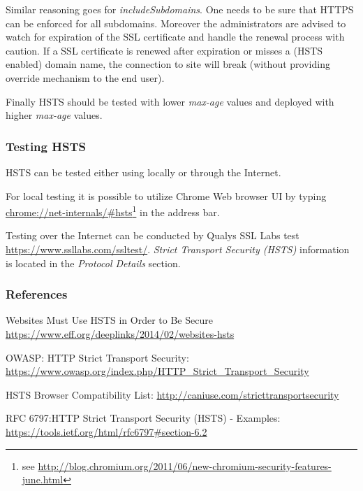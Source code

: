Similar reasoning goes for \emph{includeSubdomains}. One needs to be sure that HTTPS can be enforced for all subdomains. Moreover the administrators are advised to watch for expiration of the SSL certificate and handle the renewal process with caution. If a SSL certificate is renewed after expiration or misses a (HSTS enabled) domain name, the connection to site will break (without providing override mechanism to the end user).  

Finally HSTS should be tested with lower \emph{max-age} values and deployed with higher \emph{max-age} values. 

\subsubsection{Testing HSTS}
\label{subsubsection:Testing HSTS}
HSTS can be tested either using locally or through the Internet. 

For local testing it is possible to utilize Chrome Web browser UI by typing \url{chrome://net-internals/#hsts}\footnote{see \url{http://blog.chromium.org/2011/06/new-chromium-security-features-june.html}} in the address bar.

Testing over the Internet can be conducted by Qualys SSL Labs test \url{https://www.ssllabs.com/ssltest/}. \emph{Strict Transport Security (HSTS)} information is located in the \emph{Protocol Details} section.

\subsubsection{References}
\begin{itemize*}
	\item Websites Must Use HSTS in Order to Be Secure \url{https://www.eff.org/deeplinks/2014/02/websites-hsts}
	\item OWASP: HTTP Strict Transport Security: \url{https://www.owasp.org/index.php/HTTP_Strict_Transport_Security}
	\item HSTS Browser Compatibility List: \url{http://caniuse.com/stricttransportsecurity}
  \item RFC 6797:HTTP Strict Transport Security (HSTS) - Examples: \url{https://tools.ietf.org/html/rfc6797#section-6.2}
\end{itemize*}


